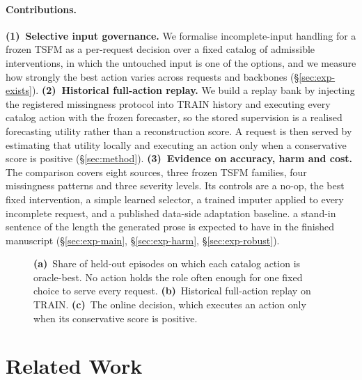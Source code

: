 \documentclass{article}
\newcommand{\figph}[3]{%
  \fbox{\parbox[c][#2][c]{#1}{\centering
    \textcolor{phgray}{\textsf{[\detokenize{#3}]}}}}}
\newcommand{\tsfm}{TSFM}
\begin{document}
\paragraph{Contributions.}
\textbf{(1)~Selective input governance.} We formalise incomplete-input handling for a frozen
\tsfm{} as a per-request decision over a fixed catalog of admissible interventions, in which
the untouched input is one of the options, and we measure how strongly the best action varies
across requests and backbones (\S\ref{sec:exp-exists}). \textbf{(2)~Historical full-action
replay.} We build a replay bank by injecting the registered missingness protocol into TRAIN
history and executing every catalog action with the frozen forecaster, so the stored
supervision is a realised forecasting utility rather than a reconstruction score. A request is
then served by estimating that utility locally and executing an action only when a
conservative score is positive (\S\ref{sec:method}). \textbf{(3)~Evidence on accuracy, harm
and cost.} The comparison covers eight sources, three frozen \tsfm{} families, four missingness
patterns and three severity levels. Its controls are a no-op, the best fixed intervention, a
simple learned selector, a trained imputer applied to every incomplete request, and a published
data-side adaptation baseline. a stand-in sentence of the length the generated prose is expected to have in the finished manuscript
(\S\ref{sec:exp-main}, \S\ref{sec:exp-harm}, \S\ref{sec:exp-robust}).

\begin{figure}[t]
  \centering
  \figph{0.64\textwidth}{3.4cm}{FIGURE_1_SELECTIVE_GOVERNANCE}
  \caption{\textbf{(a)}~Share of held-out episodes on which each catalog action is oracle-best.
  No action holds the role often enough for one fixed choice to serve every request.
  \textbf{(b)}~Historical full-action replay on TRAIN. \textbf{(c)}~The online decision, which
  executes an action only when its conservative score is positive.}
  \label{fig:concept}
\end{figure}

\section{Related Work}
\label{sec:related}
\end{document}
